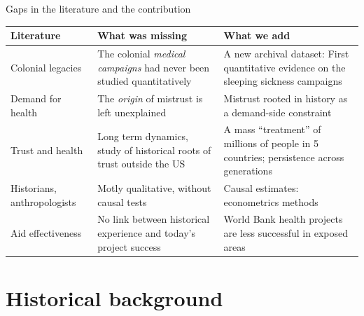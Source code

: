 \documentclass[aspectratio=1610]{beamer}
\begin{document}
\begin{frame}{Gaps in the literature and the contribution}
  \footnotesize
  \renewcommand{\arraystretch}{1.25}
  \begin{tabular}{@{}>{\raggedright\arraybackslash}p{}
                    >{\raggedright\arraybackslash}p{}
                    >{\raggedright\arraybackslash}p{}@{}}
    \toprule
    \textbf{Literature} & \textbf{What was missing} & \textbf{What we add} \\
    \midrule
    Colonial legacies &
      The colonial \emph{medical campaigns} had never been studied quantitatively &
      A new archival dataset: First quantitative evidence on the sleeping sickness campaigns \\
    Demand for health &
      The \emph{origin} of mistrust is left unexplained &
      Mistrust rooted in history as a demand-side constraint \\
    Trust and health &
      Long term dynamics, study of historical roots of trust outside the US &
      A mass ``treatment'' of millions of people in 5 countries; persistence across generations \\
    Historians, anthropologists &
      Motly qualitative, without causal tests &
      Causal estimates: econometrics methods \\
    Aid effectiveness &
      No link between historical experience and today's project success &
      World Bank health projects are less successful in exposed areas \\
    \bottomrule
  \end{tabular}
\end{frame}

\section{Historical background}
\end{document}
